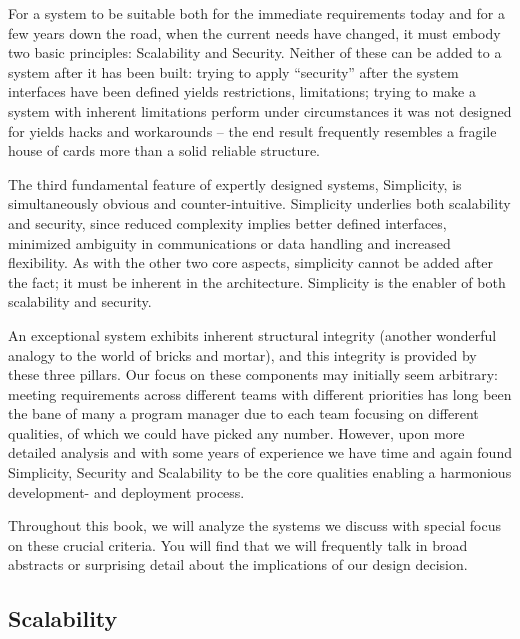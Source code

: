 For a system to be suitable both for the immediate
requirements today and for a few years down the road,
when the current needs have changed, it must embody
two basic principles: Scalability and Security.
Neither of these can be added to a system after it has
been built:  trying to apply ``security'' after the
system interfaces have been defined yields
restrictions, limitations; trying to make a system
with inherent limitations perform under circumstances
it was not designed for yields hacks and workarounds
-- the end result frequently resembles a fragile house
of cards more than a solid reliable structure.

The third fundamental feature of expertly designed
systems, Simplicity, is simultaneously obvious and
counter-intuitive.  Simplicity underlies both
scalability and security, since reduced complexity
implies better defined interfaces, minimized ambiguity
in communications or data handling and increased
flexibility.  As with the other two core aspects,
simplicity cannot be added after the fact; it must be
inherent in the architecture.  Simplicity is the
enabler of both scalability and security.

An exceptional system exhibits inherent structural
integrity (another wonderful analogy to the world of
bricks and mortar), and this integrity is provided by
these three pillars.  Our focus on these components
may initially seem arbitrary: meeting requirements
across different teams with different priorities has
long been the bane of many a program manager due to
each team focusing on different qualities, of which we
could have picked any number.  However, upon more
detailed analysis and with some years of experience we
have time and again found Simplicity, Security and
Scalability to be the core qualities enabling a
harmonious development- and deployment process.

Throughout this book, we will analyze the systems we
discuss with special focus on these crucial criteria.
You will find that we will frequently talk in broad
abstracts or surprising detail about the implications
of our design decision.

\subsection{Scalability}
\label{introduction:pillars:scalability}

